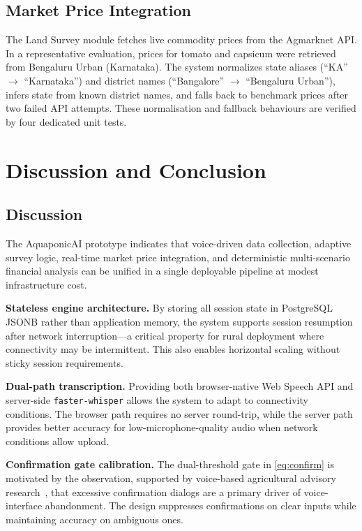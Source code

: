 \documentclass[conference]{IEEEtran}
\begin{document}
\subsection{Market Price Integration}

The Land Survey module fetches live commodity prices from the
Agmarknet API. In a representative evaluation, prices for tomato and capsicum were
retrieved from Bengaluru Urban (Karnataka). The system normalizes
state aliases (``KA'' $\rightarrow$ ``Karnataka'') and district names
(``Bangalore'' $\rightarrow$ ``Bengaluru Urban''), infers state from
known district names, and falls back to benchmark prices after two
failed API attempts. These normalisation and fallback behaviours are
verified by four dedicated unit tests.



\section{Discussion and Conclusion}
\label{sec:conclusion}

\subsection{Discussion}

The AquaponicAI prototype indicates that voice-driven data collection,
adaptive survey logic, real-time market price integration, and
deterministic multi-scenario financial analysis can be unified in a
single deployable pipeline at modest infrastructure cost.

\medskip
\noindent\textbf{Stateless engine architecture.}
By storing all session state in PostgreSQL JSONB rather than application
memory, the system supports session resumption after network
interruption---a critical property for rural deployment where
connectivity may be intermittent. This also enables horizontal
scaling without sticky session requirements.

\medskip
\noindent\textbf{Dual-path transcription.}
Providing both browser-native Web Speech API and server-side
\texttt{faster-whisper} allows the system to adapt to connectivity conditions.
The browser path requires no server round-trip, while the server path
provides better accuracy for low-microphone-quality audio when network
conditions allow upload.

\medskip
\noindent\textbf{Confirmation gate calibration.}
The dual-threshold gate in \eqref{eq:confirm} is motivated by the
observation, supported by voice-based agricultural advisory
research~\cite{ref3,ref20}, that excessive confirmation dialogs are a
primary driver of voice-interface abandonment. The design suppresses
confirmations on clear inputs while maintaining accuracy on
ambiguous ones.
\end{document}
